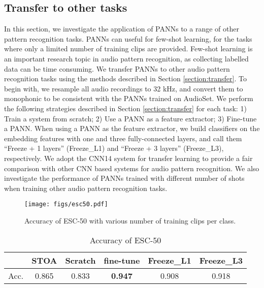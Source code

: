 \documentclass[journal]{IEEEtran}
\newcommand{\qk}[1] {{\color{black} #1}}
\begin{document}
\subsection{Transfer to other tasks}
In this section, we investigate the application of PANNs to a range of other pattern recognition tasks. PANNs can useful for few-shot learning, for the tasks where only a limited number of training clips are provided. Few-shot learning is an important research topic in audio pattern recognition, as collecting labelled data can be time consuming. We transfer PANNs to other audio pattern recognition tasks using the methods described in Section \ref{section:transfer}. To begin with, we resample all audio recordings to 32 kHz, and convert them to monophonic to be consistent with the PANNs trained on AudioSet. We perform the following strategies described in Section \ref{section:transfer} for each task: 1) Train a system from scratch; 2) Use a PANN as a feature extractor; 3) Fine-tune a PANN. When using a PANN as the feature extractor, we build classifiers on the embedding features with one and three fully-connected layers, and call them ``Freeze + 1 layers'' (Freeze\_L1) and ``Freeze + 3 layers'' (Freeze\_L3), respectively. \qk{We adopt the CNN14 system for transfer learning to provide a fair comparison with other CNN based systems for audio pattern recognition.} We also investigate the performance of PANNs trained with different number of shots when training other audio pattern recognition tasks.

\begin{figure}[t]
  \centering
  \centerline{\texttt{[image: figs/esc50.pdf]}}
  \caption{Accuracy of ESC-50 with various number of training clips per class.}
  \label{fig:esc50}
\end{figure}

\begin{table}[t]
\centering
\caption{Accuracy of ESC-50}
\label{table:esc50}
\begin{tabular}{*{6}{c}}
 \toprule
 & STOA \cite{sailor2017unsupervised} & Scratch & fine-tune & Freeze\_L1 & Freeze\_L3 \\
 \midrule
 Acc. & 0.865 & 0.833 & \textbf{0.947} & 0.908 & 0.918 \\
 \bottomrule
\end{tabular}
\end{table}
\end{document}
